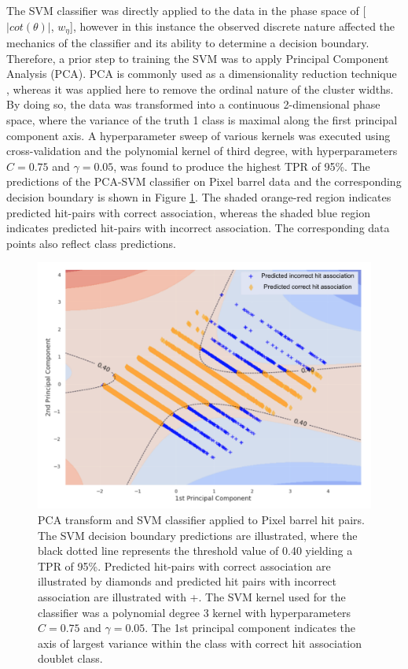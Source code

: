 The SVM classifier was directly applied to the data in the phase space of  [$|cot(\theta)|$, $w_{\eta}$], however in this instance the observed discrete nature affected the mechanics of the classifier and its ability to determine a decision boundary. Therefore, a prior step to training the SVM was to apply Principal Component Analysis (PCA). PCA is commonly used as a dimensionality reduction technique \cite{pca}, whereas it was applied here to remove the ordinal nature of the cluster widths. By doing so, the data was transformed into a continuous 2-dimensional phase space, where the variance of the truth 1 class is maximal along the first principal component axis. A hyperparameter sweep of various kernels was executed using cross-validation and the polynomial kernel of third degree, with hyperparameters $C=0.75$ and $\gamma=0.05$, was found to produce the highest TPR of 95\%. The predictions of the PCA-SVM classifier on Pixel barrel data and the corresponding decision boundary is shown in Figure \ref{fig:barrel-svm-pca}. The shaded orange-red region indicates predicted hit-pairs with correct association, whereas the shaded blue region indicates predicted hit-pairs with incorrect association. The corresponding data points also reflect class predictions.  

\begin{figure}[htbp]
\centering
\includegraphics[width=0.87\linewidth]{images/4-ml-based-predictor/barrel-svm-pca.png}
\caption{PCA transform and SVM classifier applied to Pixel barrel hit pairs. The SVM decision boundary predictions are illustrated, where the black dotted line represents the threshold value of 0.40 yielding a TPR of 95\%. Predicted hit-pairs with correct association are illustrated by diamonds and predicted hit pairs with incorrect association are illustrated with +. The SVM kernel used for the classifier was a polynomial degree 3 kernel with hyperparameters $C=0.75$ and $\gamma=0.05$. The 1st principal component indicates the axis of largest variance within the class with correct hit association doublet class.}
\label{fig:barrel-svm-pca}
\end{figure}

